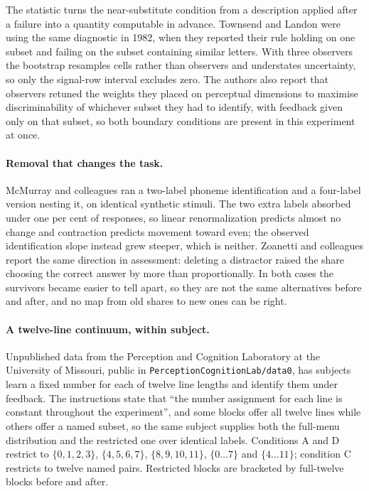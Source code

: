 \documentclass[11pt]{article}
\begin{document}
The statistic turns the near-substitute condition from a description applied after a failure
into a quantity computable in advance. Townsend and Landon \cite{townsendlandon1982} were
using the same diagnostic in 1982, when they reported their rule holding on one subset and
failing on the subset containing similar letters. With three observers the bootstrap
resamples cells rather than observers and understates uncertainty, so only the signal-row
interval excludes zero. The authors also report that observers retuned the weights they placed
on perceptual dimensions to maximise discriminability of whichever subset they had to identify,
with feedback given only on that subset, so both boundary conditions are present in this
experiment at once.

\paragraph{Removal that changes the task.} McMurray and colleagues \cite{mcmurray2008} ran a
two-label phoneme identification and a four-label version nesting it, on identical synthetic
stimuli. The two extra labels absorbed under one per cent of responses, so linear renormalization
predicts almost no change and contraction predicts movement toward even; the observed
identification slope instead grew steeper, which is neither. Zoanetti and colleagues
\cite{zoanetti2013} report the same direction in assessment: deleting a distractor raised the
share choosing the correct answer by more than proportionally. In both cases the survivors
became easier to tell apart, so they are not the same alternatives before and after, and no
map from old shares to new ones can be right.

\paragraph{A twelve-line continuum, within subject.} Unpublished data from the Perception and
Cognition Laboratory at the University of Missouri, public in
\texttt{PerceptionCognitionLab/data0}, has subjects learn a fixed number for each of twelve
line lengths and identify them under feedback. The instructions state that ``the number
assignment for each line is constant throughout the experiment'', and some blocks offer all
twelve lines while others offer a named subset, so the same subject supplies both the full-menu
distribution and the restricted one over identical labels. Conditions A and D restrict to
$\{0,1,2,3\}$, $\{4,5,6,7\}$, $\{8,9,10,11\}$, $\{0\ldots7\}$ and $\{4\ldots11\}$; condition C
restricts to twelve named pairs. Restricted blocks are bracketed by full-twelve blocks before
and after.
\end{document}
